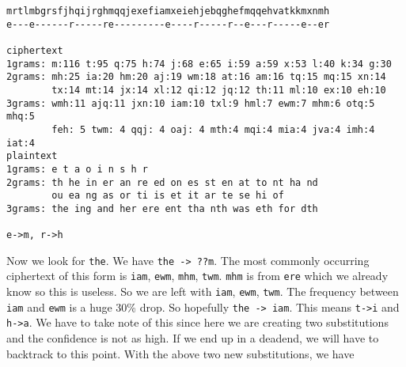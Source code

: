 \begin{Verbatim}[frame=single,fontsize=\tiny]
mrtlmbgrsfjhqijrghmqqjexefiamxeiehjebqghefmqqehvatkkmxnmh
e---e------r-----re---------e----r-----r--e---r-----e--er

ciphertext
1grams: m:116 t:95 q:75 h:74 j:68 e:65 i:59 a:59 x:53 l:40 k:34 g:30
2grams: mh:25 ia:20 hm:20 aj:19 wm:18 at:16 am:16 tq:15 mq:15 xn:14
        tx:14 mt:14 jx:14 xl:12 qi:12 jq:12 th:11 ml:10 ex:10 eh:10
3grams: wmh:11 ajq:11 jxn:10 iam:10 txl:9 hml:7 ewm:7 mhm:6 otq:5 mhq:5
        feh: 5 twm: 4 qqj: 4 oaj: 4 mth:4 mqi:4 mia:4 jva:4 imh:4 iat:4
plaintext
1grams: e t a o i n s h r
2grams: th he in er an re ed on es st en at to nt ha nd
        ou ea ng as or ti is et it ar te se hi of
3grams: the ing and her ere ent tha nth was eth for dth

e->m, r->h
\end{Verbatim}


Now we look for \verb!the!.
We have \verb!the -> ??m!.
The most commonly occurring ciphertext of this form is 
\verb!iam!,
\verb!ewm!,
\verb!mhm!,
\verb!twm!.
\verb!mhm! is from \verb!ere! which we already know so this is useless.
So we are left with
\verb!iam!,
\verb!ewm!,
\verb!twm!.
The frequency between \verb!iam! and \verb!ewm! is a huge 30\% drop.
So hopefully \verb!the -> iam!.
This means \verb!t->i! and \verb!h->a!.
We have to take note of this since here we are creating two substitutions
and the confidence is not as high.
If we end up in a deadend, we will have to backtrack to this point.
With the above two new substitutions, we have

